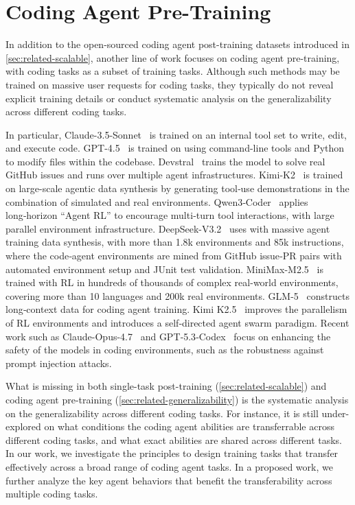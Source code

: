 \documentclass[12pt,openany]{cmuthesis}
\begin{document}
\section{Coding Agent Pre-Training}
\label{sec:related-generalizability}
In addition to the open-sourced coding agent post-training datasets introduced in \autoref{sec:related-scalable}, another line of work focuses on coding agent pre-training, with coding tasks as a subset of training tasks. Although such methods may be trained on massive user requests for coding tasks, they typically do not reveal explicit training details or conduct systematic analysis on the generalizability across different coding tasks.

In particular, 
Claude-3.5-Sonnet~\cite{claude35} is trained on an internal tool set to write, edit, and execute code.
GPT-4.5~\cite{gpt45} is trained on using command-line tools and Python to modify files within the codebase.
Devstral~\cite{devstral} trains the model to solve real GitHub issues and runs over multiple agent infrastructures.
Kimi-K2~\cite{kimik2} is trained on large-scale agentic data synthesis by generating tool‑use demonstrations in the combination of simulated and real environments.
Qwen3‑Coder~\cite{qwen3} applies long‑horizon ``Agent RL'' to encourage multi‑turn tool interactions, with large parallel environment infrastructure.
DeepSeek-V3.2~\cite{deepseekv3} uses with massive agent training data synthesis, with more than 1.8k environments and 85k instructions, where the code‑agent environments are mined from GitHub issue‑PR pairs with automated environment setup and JUnit test validation.
MiniMax-M2.5~\cite{minimax25} is trained with RL in hundreds of thousands of complex real-world environments, covering more than 10 languages and 200k real environments.
GLM-5~\cite{GLM-5} constructs long‑context data for coding agent training.
Kimi K2.5~\cite{kimik25} improves the parallelism of RL environments and introduces a self‑directed agent swarm paradigm.
Recent work such as Claude-Opus-4.7~\cite{claude47} and GPT‑5.3‑Codex~\cite{gpt53codex} focus on enhancing the safety of the models in coding environments, such as the robustness against prompt injection attacks.

What is missing in both single-task post-training (\autoref{sec:related-scalable}) and coding agent pre-training (\autoref{sec:related-generalizability}) is the systematic analysis on the generalizability across different coding tasks.
For instance, it is still under-explored on what conditions the coding agent abilities are transferrable across different coding tasks, and what exact abilities are shared across different tasks.
In our work, we investigate the principles to design training tasks that transfer effectively across a broad range of coding agent tasks.
In a proposed work, we further analyze the key agent behaviors that benefit the transferability across multiple coding tasks.
\end{document}
